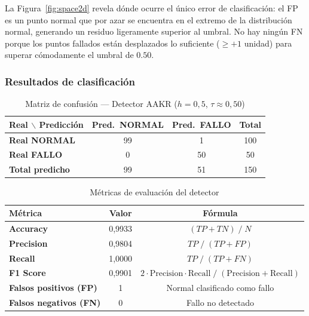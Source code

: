 \documentclass[12pt,a4paper]{article}
\newcommand{\caja}[1]{%
  \vspace{6pt}%
  \noindent\colorbox{cajaFondo}{\parbox{\dimexpr\linewidth-2\fboxsep}{%
    \color{azulTDS}\small #1}}%
  \vspace{6pt}%
}
\begin{document}
\caja{La Figura~\ref{fig:space2d} revela d\'onde ocurre el \'unico error de
clasificaci\'on: el FP es un punto normal que por azar se encuentra en el extremo
de la distribuci\'on normal, generando un residuo ligeramente superior al umbral.
No hay ning\'un FN porque los puntos fallados est\'an desplazados lo suficiente
($\geq +1$ unidad) para superar c\'omodamente el umbral de $0.50$.}

\subsubsection{Resultados de clasificaci\'on}

\begin{table}[H]
\centering
\caption{Matriz de confusi\'on --- Detector AAKR ($h=0{,}5$, $\tau \approx 0{,}50$)}
\label{tab:confusion}
\renewcommand{\arraystretch}{1.6}
\setlength{\tabcolsep}{12pt}
\begin{tabular}{l|cc|c}
\toprule
\multirow{2}{*}{\textbf{Real $\backslash$ Predicci\'on}}
  & \textbf{Pred.\ NORMAL}
  & \textbf{Pred.\ FALLO}
  & \textbf{Total} \\
\midrule
\textbf{Real NORMAL}
  & \cellcolor{verdeOK!20}99
  & \cellcolor{rojoFail!20}1
  & 100 \\
\textbf{Real FALLO}
  & \cellcolor{rojoFail!20}0
  & \cellcolor{verdeOK!20}50
  & 50  \\
\midrule
\textbf{Total predicho} & 99 & 51 & 150 \\
\bottomrule
\end{tabular}
\end{table}

\begin{table}[H]
\centering
\caption{M\'etricas de evaluaci\'on del detector}
\label{tab:metrics}
\renewcommand{\arraystretch}{1.45}
\begin{tabular}{>{\bfseries}lcc}
\toprule
\rowcolor{azulTDS!15}
M\'etrica & Valor & F\'ormula \\
\midrule
Accuracy   & 0{,}9933 & $(TP + TN)\;/\;N$ \\
\rowcolor{grisClaro}
Precision  & 0{,}9804 & $TP\;/\;(TP + FP)$ \\
Recall     & 1{,}0000 & $TP\;/\;(TP + FN)$ \\
\rowcolor{grisClaro}
F1 Score   & 0{,}9901 & $2\cdot\text{Precision}\cdot\text{Recall}\;/\;(\text{Precision}+\text{Recall})$ \\
\midrule
Falsos positivos (FP) & 1 & Normal clasificado como fallo \\
\rowcolor{grisClaro}
Falsos negativos (FN) & 0 & Fallo no detectado \\
\bottomrule
\end{tabular}
\end{table}
\end{document}
